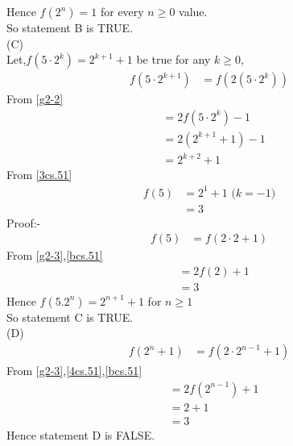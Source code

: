 \documentclass[journal,12pt,twocolumn]{IEEEtran}
\theoremstyle{remark}
\begin{document}
Hence $f(2^n)=1$ for every $n\geq0$ value.\\
So statement B is TRUE.\\
(C)\\
Let,$f(5\cdot2^k)=2^{k+1}+1$ be true for any $k\geq0$,
\begin{align}
	f(5\cdot2^{k+1})&=f(2(5\cdot2^k))
\end{align}
From \eqref{g2-2}
\begin{align}
	&=2f(5\cdot2^k)-1\\
        &=2(2^{k+1}+1)-1\\
	&=2^{k+2}+1\label{3cs.51}
\end{align}
From \eqref{3cs.51}
\begin{align}
	f(5)&=2^1+1\text{  ($k=-1$)}\\
	&=3
\end{align}
Proof:-
\begin{align}
        f(5)&=f(2\cdot2+1)
\end{align}
From \eqref{g2-3},\eqref{bcs.51}
\begin{align}
        &=2f(2)+1\\
        &=3
\end{align}
Hence $f(5.2^n)=2^{n+1}+1$ for $n\geq1$\\
So statement C is TRUE.\\
(D)
\begin{align}
	f(2^n+1)&=f(2\cdot2^{n-1}+1)\label{4cs.51}
\end{align}
From \eqref{g2-3},\eqref{4cs.51},\eqref{bcs.51}
\begin{align}
	&=2f(2^{n-1})+1\\
	&=2+1\\
	&=3
\end{align}
Hence statement D is FALSE.
\end{document}

